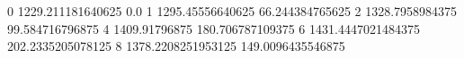 0 1229.211181640625 0.0
1 1295.45556640625 66.244384765625
2 1328.7958984375 99.584716796875
4 1409.91796875 180.706787109375
6 1431.4447021484375 202.2335205078125
8 1378.2208251953125 149.0096435546875
